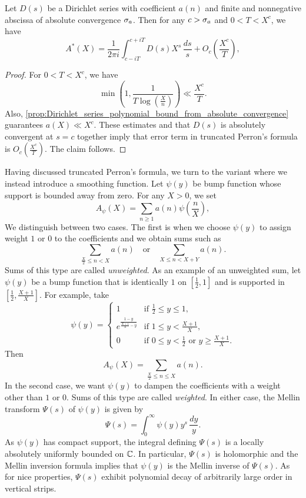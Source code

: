 \documentclass[12pt]{article}
\begin{document}
    \begin{corollary}
      Let \(D(s)\) be a Dirichlet series with coefficient \(a(n)\) and finite and nonnegative abscissa of absolute convergence \(\sigma_{a}\). Then for any \(c > \sigma_{a}\) and \(0 < T < X^{c}\), we have
      \[
        A^{\ast}(X) = \frac{1}{2\pi i}\int_{c-iT}^{c+iT}D(s)X^{s}\,\frac{ds}{s}+O_{c}\left(\frac{X^{c}}{T}\right),
      \]
    \end{corollary}
    \begin{proof}
      For \(0 < T < X^{c}\), we have
      \[
        \min\left(1,\frac{1}{T\log\left(\frac{X}{n}\right)}\right) \ll \frac{X^{c}}{T}.
      \]
      Also, \cref{prop:Dirichlet_series_polynomial_bound_from_absolute_convergence} guarantees \(a(X) \ll X^{c}\). These estimates and that \(D(s)\) is absolutely convergent at \(s = c\) together imply that error term in truncated Perron's formula is \(O_{c}\left(\frac{X^{c}}{T}\right)\). The claim follows.
    \end{proof}

    Having discussed truncated Perron's formula, we turn to the variant where we instead introduce a smoothing function. Let \(\psi(y)\) be bump function whose support is bounded away from zero. For any \(X > 0\), we set
    \[
      A_{\psi}(X) = \sum_{n \ge 1}a(n)\psi\left(\frac{n}{X}\right),
    \]
    We distinguish between two cases. The first is when we choose \(\psi(y)\) to assign weight \(1\) or \(0\) to the coefficients and we obtain sums such as
    \[
      \sum_{\frac{X}{2} \le n < X}a(n) \quad \text{or} \quad \sum_{X \le n < X+Y}a(n).
    \]
    Sums of this type are called \textit{unweighted}. As an example of an unweighted sum, let \(\psi(y)\) be a bump function that is identically \(1\) on \(\left[\frac{1}{2},1\right]\) and is supported in \(\left[\frac{1}{2},\frac{X+1}{X}\right]\). For example, take
    \[
      \psi(y) = \begin{cases} 1 & \text{if \(\frac{1}{2} \le y \le 1\)}, \\ e^{\frac{1-y}{\frac{X+1}{X}-y}} & \text{if \(1 \le y < \frac{X+1}{X}\)}, \\ 0 & \text{if \(0 \le y < \frac{1}{2}\) or \(y \ge \frac{X+1}{X}\)}. \end{cases}
    \]
    Then
    \[
      A_{\psi}(X) = \sum_{\frac{X}{2} \le n \le X}a(n).
    \]
    In the second case, we want \(\psi(y)\) to dampen the coefficients with a weight other than \(1\) or \(0\). Sums of this type are called \textit{weighted}. In either case, the Mellin transform \(\Psi(s)\) of \(\psi(y)\) is given by
    \[
      \Psi(s) = \int_{0}^{\infty}\psi(y)y^{s}\,\frac{dy}{y}.
    \]
    As \(\psi(y)\) has compact support, the integral defining \(\Psi(s)\) is a locally absolutely uniformly bounded on \(\mathbb{C}\). In particular, \(\Psi(s)\) is holomorphic and the Mellin inversion formula implies that \(\psi(y)\) is the Mellin inverse of \(\Psi(s)\). As for nice properties, \(\Psi(s)\) exhibit polynomial decay of arbitrarily large order in vertical strips.
\end{document}
